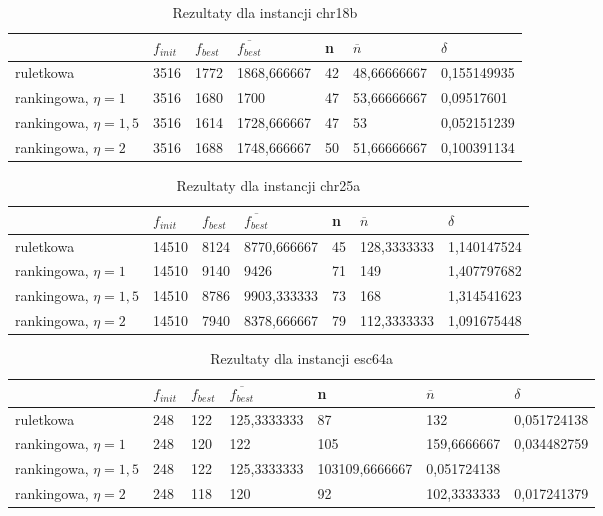 \begin{table}[H]
\label{T5_chr18b}
\begin{tabular}{l l l l l l l}
\hline
 & $f_{init}$ & $f_{best}$ & $\overline{f_{best}}$ & n & $\overline{n}$ & $\delta$ \\
\hline
ruletkowa & 3516 & 1772 & 1868,666667 & 42 & 48,66666667 & 0,155149935\\
rankingowa, $\eta = 1$ & 3516 & 1680 & 1700 & 47 & 53,66666667 & 0,09517601\\
rankingowa, $\eta = 1,5$ & 3516 & 1614 & 1728,666667 & 47 & 53 & 0,052151239\\
rankingowa, $\eta = 2$ & 3516 & 1688 & 1748,666667 & 50 & 51,66666667 & 0,100391134\\
\hline
\end{tabular}
\caption{Rezultaty dla instancji chr18b}
\end{table}

\begin{table}[H]
\label{T5_chr25a}
\begin{tabular}{l l l l l l l}
\hline
 & $f_{init}$ & $f_{best}$ & $\overline{f_{best}}$ & n & $\overline{n}$ & $\delta$ \\
\hline
ruletkowa & 14510 & 8124 & 8770,666667 & 45 & 128,3333333 & 1,140147524\\
rankingowa, $\eta = 1$ & 14510 & 9140 & 9426 & 71 & 149 & 1,407797682\\
rankingowa, $\eta = 1,5$ & 14510 & 8786 & 9903,333333 & 73 & 168 & 1,314541623\\
rankingowa, $\eta = 2$ & 14510 & 7940 & 8378,666667 & 79 & 112,3333333 & 1,091675448\\
\hline
\end{tabular}
\caption{Rezultaty dla instancji chr25a}
\end{table}

\begin{table}[H]
\label{T5_esc64a}
\begin{tabular}{l l l l l l l}
\hline
 & $f_{init}$ & $f_{best}$ & $\overline{f_{best}}$ & n & $\overline{n}$ & $\delta$ \\
\hline
ruletkowa & 248 & 122 & 125,3333333 & 87 & 132 & 0,051724138\\
rankingowa, $\eta = 1$ & 248 & 120 & 122 & 105 & 159,6666667 & 0,034482759\\
rankingowa, $\eta = 1,5$ & 248 & 122 & 125,3333333 & 103109,6666667 & 0,051724138\\
rankingowa, $\eta = 2$ & 248 & 118 & 120 & 92 & 102,3333333 & 0,017241379\\
\hline
\end{tabular}
\caption{Rezultaty dla instancji esc64a}
\end{table}


